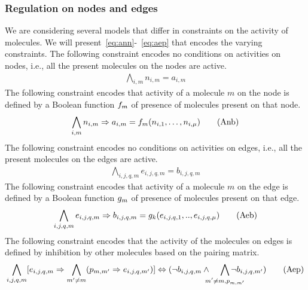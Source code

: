 \subsubsection{Regulation on nodes and edges}
We are considering several models that differ in constraints on
the activity of molecules.
%
We will present~\eqref{eq:ann}-~\eqref{eq:aep} that encodes
the varying constraints.
%
The following constraint encodes no conditions on activities on nodes,
i.e., all the present molecules on the nodes are active.
\begin{align}
\bigwedge\limits_{i,m} n_{i,m} = a_{i,m}    \tag{Ann}\label{eq:ann}
\end{align}
The following constraint encodes that activity of a molecule $m$ on the node is
defined by a Boolean function $f_m$ of presence of molecules present on that node.
\begin{align}
\bigwedge\limits_{i,m} n_{i,m} \Rightarrow a_{i,m} =  f_m (n_{i,1},\dots,n_{i,\mu}) 
\tag{Anb}\label{eq:anb}
\end{align}
The following constraint encodes no conditions on activities on edges,
i.e., all the present molecules on the edges are active.
\begin{align}
  \bigwedge\limits_{i,j,q,m} e_{i,j,q,m} = b_{i,j,q,m}
\tag{Aen}\label{eq:aen}
\end{align}
The following constraint encodes that activity of a molecule $m$ on the edge is
defined by a Boolean function $g_m$ of presence of molecules present on that edge.
\begin{align}
   \bigwedge\limits_{i,j,q,m} e_{i,j,q,m} \Rightarrow b_{i,j,q,m} = g_k(e_{i,j,q,1}, .., e_{i,j,q,\mu} )
  \tag{Aeb}\label{eq:aeb}
\end{align}
%
The following constraint encodes that the activity of the molecules on
edges is defined by inhibition by other molecules based on the pairing
matrix. 
\begin{align}
   \bigwedge\limits_{i,j,q, m}  [e_{i,j,q,m} \limplies  \bigwedge_{m' \neq m} (p_{m,m'} \limplies e_{i,j,q,m'})] \lequiv (\neg b_{i,j,q,m} \land\;\;\;\;  \bigwedge_{\mathclap{m' \neq m, p_{m,m'}}} \neg b_{i,j,q,m'})
  \tag{Aep}\label{eq:aep}
\end{align}
%
